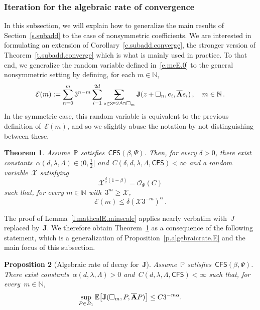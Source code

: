 \documentclass[11pt]{article} %
\makeatletter
\let\oldsquare\square %
\renewcommand{\square}{\oldsquare}
\numberwithin{equation}{section}
\newtheorem{theorem}{Theorem}[section]
\newtheorem{proposition}[theorem]{Proposition}
\theoremstyle{definition}
\let\originalleft\left
\let\originalright\right
\renewcommand{\left}{\mathopen{}\mathclose\bgroup\originalleft}
\renewcommand{\right}{\aftergroup\egroup\originalright}
\newcommand*{\N}{\ensuremath{\mathbb{N}}}
\newcommand*{\Zd}{\ensuremath{\mathbb{Z}^d}}
\newcommand{\cu}{\square}
\renewcommand{\P}{\mathbb{P}}
\newcommand{\E}{\mathbb{E}}
\newcommand{\X}{\mathcal{X}}
\renewcommand{\O}{\mathcal{O}}
\newcommand{\avsum}{\mathop{\mathpalette\avsuminner\relax}\displaylimits}
\newcommand\avsuminner[2]{%
  {\sbox0{$\m@th#1\sum$}%
   \vphantom{\usebox0}%
   \ooalign{%
     \hidewidth
     \smash{\,\rule[.23em]{8.8pt}{1.1pt} \relax}%
     \hidewidth\cr
     $\m@th#1\sum$\cr
   }%
  }%
}
\newcommand{\CFS}{\mathsf{CFS}}
\newcommand{\bfAhom}{\overline{\mathbf{A}}}
\newcommand{\bfJ}{\mathbf{J}}
\makeatother
\begin{document}
\subsubsection{Iteration for the algebraic rate of convergence}
\label{ss.subadd.conv.nosymm}

In this subsection, we will explain how to  generalize the main results of Section~\ref{s.subadd} to the case of nonsymmetric coefficients. 
We are interested in formulating an extension of Corollary~\ref{c.subadd.converge}, the stronger version of Theorem~\ref{t.subadd.converge} which is what is mainly used in practice. 
To that end, we generalize the random variable defined in~\eqref{e.mcE.0} to the general nonsymmetric setting by defining, for each $m\in\N$,
\begin{equation} 
\label{e.mcE.0.nonsymm}
\mathcal{E}(m) 
:=
\sum_{n=0}^{m}
3^{n-m} 
\sum_{i=1}^{2d}
\avsum_{z\in 3^n\Zd\cap \cu_m}
\bfJ(z+\cu_n,e_i, \bfAhom e_i)
\,,\quad m\in\N\,.
\end{equation}
In the symmetric case, this random variable is equivalent to the previous definition of~$\mathcal{E}(m)$, and so we slightly abuse the notation by not distinguishing between these.

\begin{theorem}
\label{t.subadd.converge.nosymm}
Assume~$\P$ satisfies~$\CFS(\beta,\Psi)$. Then, for every $\delta>0$, there exist constants~$\alpha(d,\lambda,\Lambda) \in (0,\tfrac12]$ and~$C(\delta,d,\lambda,\Lambda,\CFS)<\infty$ and a random variable~$\X$ satisfying 
\begin{equation}
\label{e.mmmbound.nosymm}
\X^{\frac d2 (1-\beta)}
= \O_\Psi(C)
\end{equation}
such that, for every $m\in\N$ with~$3^m\geq \X$, 
\begin{equation} 
\label{e.aastar.concentrate.DD.nosymm}
\mathcal{E}(m)
\leq \delta ( \X 3^{-m})^\alpha 
\,.
\end{equation}
\end{theorem}

The proof of Lemma~\ref{l.mathcalE.minscale} applies nearly verbatim with~$J$ replaced by~$\bfJ$. We therefore obtain Theorem~\ref{t.subadd.converge.nosymm} as a consequence of the following statement, which is a generalization of Proposition~\ref{p.algebraicrate.E} and the main focus of this subsection.

\begin{proposition}[Algebraic rate of decay for~$\bfJ$]
\label{p.algebraic.double}
\hspace{-1pt} Assume~$\P$ satisfies~$\CFS(\beta,\Psi)$. 
There exist constants~$\alpha(d,\lambda,\Lambda) >0$ and~$C(d,\lambda,\Lambda,\CFS)<\infty$
such that, for every~$m\in\N$,  
\begin{equation}
\label{e.EJtozero.rate.nosymm}
\sup_{P\in B_1}
\E \left[ \bfJ(\cu_m,P,\bfAhom P) \right] 
\leq 
C3^{-m\alpha}. 
\end{equation}
\end{proposition}
\end{document}
